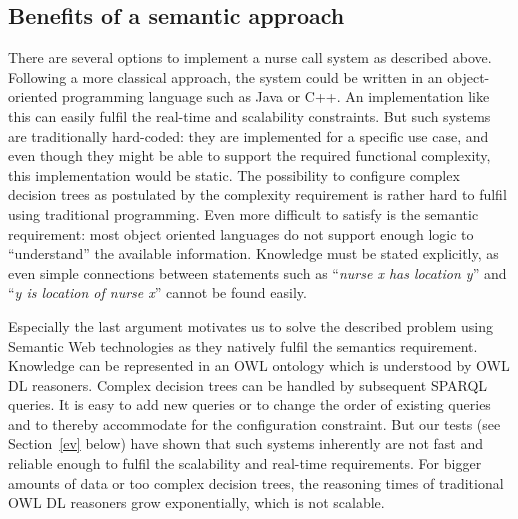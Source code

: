 \subsection{Benefits of a semantic approach}
There are several options to implement a nurse call system as described above. Following a more classical approach, the system could be written in 
an object-oriented programming language 
such as Java or C++. An implementation like this can easily fulfil the real-time and scalability constraints.
But such systems are traditionally hard-coded: they are implemented for a specific use case, and even though 
they might be able to support the required functional complexity, this implementation would be static. The possibility to configure complex decision trees
as postulated by the complexity requirement is rather hard to fulfil using traditional programming. Even more difficult to satisfy is the semantic requirement:
most object oriented languages do not support enough logic to ``understand'' the available information. Knowledge must be stated explicitly, 
as even simple connections between statements such as ``\textit{nurse x has location y}'' and ``\textit{y is location of nurse x}'' cannot be found easily.

Especially the last argument motivates us to solve the described problem using Semantic Web technologies as they natively fulfil the semantics requirement.
Knowledge can be represented in an OWL ontology which is understood by OWL DL reasoners. %
Complex decision trees can be handled by subsequent SPARQL queries. It is easy to add new queries or to change the order of existing queries 
and to thereby accommodate for the configuration constraint.
But our tests (see Section~\ref{ev} below) have shown that such systems inherently are not fast and reliable enough to fulfil the scalability and real-time requirements.
For bigger amounts of data or too complex decision trees, the reasoning times of traditional OWL DL reasoners grow exponentially, which is not scalable.

